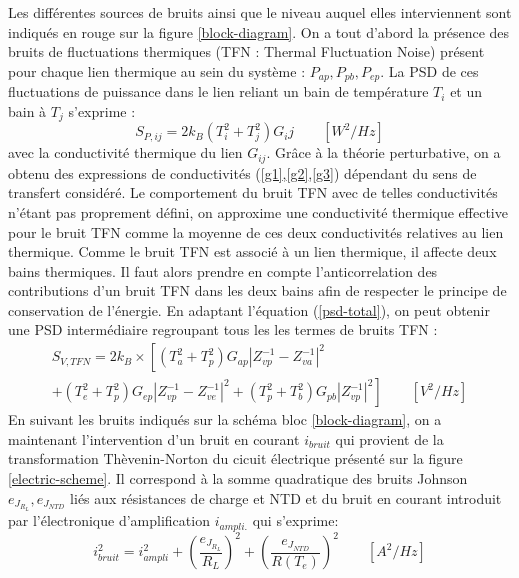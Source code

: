 Les différentes sources de bruits ainsi que le niveau auquel elles interviennent sont indiqués en rouge sur la figure \ref{block-diagram}. On a tout d'abord la présence des bruits de fluctuations thermiques (TFN : Thermal Fluctuation Noise) présent pour chaque lien thermique au sein du système : $P_{ap}, P_{pb}, P_{ep}$. La PSD de ces fluctuations de puissance dans le lien reliant un bain de température $T_i$ et un bain à $T_j$ s'exprime \cite{alex} \cite{ashcroft}:
\begin{equation}
S_{P,ij} = 2k_B(T_i^2 + T_j^2) G_ij \qquad [W^2/Hz]
\end{equation}
avec la conductivité thermique du lien $G_{ij}$. Grâce à la théorie perturbative, on a obtenu des expressions de conductivités (\ref{g1},\ref{g2},\ref{g3})  dépendant du sens de transfert considéré. Le comportement du bruit TFN avec de telles conductivités n'étant pas proprement défini, on approxime une conductivité thermique effective pour le bruit TFN comme la moyenne de ces deux conductivités relatives au lien thermique. Comme le bruit TFN est associé à un lien thermique, il affecte deux bains thermiques. Il faut alors prendre en compte l'anticorrelation des contributions d'un bruit TFN dans les deux bains afin de respecter le principe de conservation de l'énergie. En adaptant l'équation (\ref{psd-total}), on peut obtenir une PSD intermédiaire regroupant tous les les termes de bruits TFN :
\begin{multline}
S_{V,TFN} = 2k_B \times  \left[ (T_a^2 + T_p^2) G_{ap} \left\vert Z_{vp}^{-1} - Z_{va}^{-1} \right\vert^2 \right. \\ \left. + (T_e^2 + T_p^2) G_{ep} \left\vert Z_{vp}^{-1} - Z_{ve}^{-1} \right\vert^2 + (T_p^2 + T_b^2) G_{pb} \left\vert Z_{vp}^{-1}\right\vert^2 \right] \qquad [V^2/Hz]
\end{multline}
En suivant les bruits indiqués sur la schéma bloc \ref{block-diagram}, on a maintenant l'intervention d'un bruit en courant $i_{bruit}$ qui provient de la transformation Thèvenin-Norton du cicuit électrique présenté sur la figure \ref{electric-scheme}. Il correspond à la somme quadratique des bruits Johnson $e_{J_{R_L}}, e_{J_{NTD}}$ liés aux résistances de charge et NTD et du bruit en courant introduit par l'électronique d'amplification $i_{ampli.}$ qui s'exprime: 
\begin{equation}
\label{i-bruit}
i_{bruit}^2 = i_{ampli}^2 + \left( \frac{e_{J_{R_L}}}{R_L} \right)^2 + \left( \frac{e_{J_{NTD}}}{R(T_e)} \right)^2 \qquad [A^2/Hz]
\end{equation}
